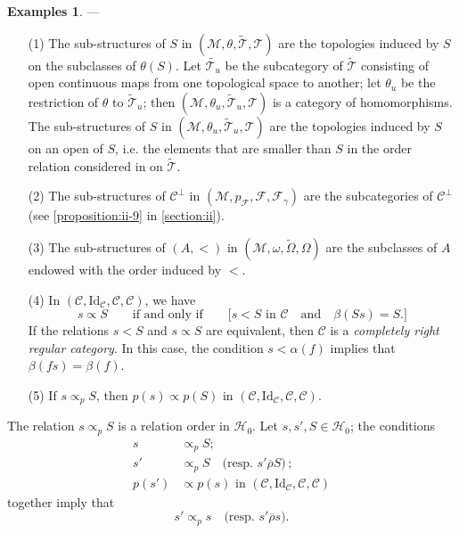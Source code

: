 \documentclass[a4paper,fleqn]{article}
\theoremstyle{plain}
\newenvironment{theorem}[1]
  {\renewcommand\theinnertheorem{#1}\innertheorem}
  {\endinnertheorem}
\theoremstyle{definition}
\newtheorem*{examples}{Examples}
\newcommand{\oldpage}[1]{{\marginpar{\footnotesize$\bigg\vert$\,\,\,\,\textit{p.~#1}}}}
\newcommand{\textand}{\quad\text{and}\quad}
\newcommand{\CC}{\mathcal{C}}
\newcommand{\HH}{\mathcal{H}}
\newcommand{\MM}{\mathcal{M}}
\newcommand{\FF}{\mathcal{F}}
\newcommand{\TT}{\mathcal{T}}
\newcommand{\tTT}{\widetilde{\TT}}
\newcommand{\relrhobar}{\mathrel{\overline{\rho}}}
\newcommand{\subs}{\mathrel{\propto}}
\newcommand{\Id}{\mathrm{Id}}
\begin{document}
\begin{examples}
  ---
  \begin{enumerate}
    \item[\normalfont(1)]
      The sub-structures of $S$ in $(\MM,\theta,\tTT,\TT)$ are the topologies induced by $S$ on the subclasses of $\theta(S)$.
      Let $\widetilde{\TT_u}$ be the subcategory of $\tTT$ consisting of open continuous maps from one topological space to another;
      let $\theta_u$ be the restriction of $\theta$ to $\tTT_u$;
      then $(\MM,\theta_u,\tTT_u,\TT)$ is a category of homomorphisms.
      The sub-structures of $S$ in $(\MM,\theta_u,\tTT_u,\TT)$ are the topologies induced by $S$ on an open of $S$, i.e. the elements that are smaller than $S$ in the order relation considered in \cite{3c} on $\tTT$.
    \item[\normalfont(2)]
      The sub-structures of $\CC^\perp$ in $(\MM,p_\FF,\FF,\FF_\gamma)$ are the subcategories of $\CC^\perp$ (see \cref{proposition:ii-9} in \cref{section:ii}).
    \item[\normalfont(3)]
      The sub-structures of $(A,<)$ in $(\MM,\omega,\widetilde{\Omega},\Omega)$ are the subclasses of $A$ endowed with the order induced by $<$.
    \item[\normalfont(4)]
      In $(\CC,\Id_\CC,\CC,\CC)$, we have
      \[
        s\subs S
        \qquad\text{if and only if}\qquad
        \big[
          \text{$s<S$ in $\CC$}
          \textand
          \beta(Ss)=S.
        \big]
      \]
      If the relations $s<S$ and $s\subs S$ are equivalent, then $\CC$ is a \emph{{completely right regular} category}.
      In this case, the condition $s<\alpha(f)$ implies that $\beta(fs)=\beta(f)$.
    \item[\normalfont(5)]
      If $s\subs_p S$, then $p(s)\subs p(S)$ in $(\CC,\Id_\CC,\CC,\CC)$.
  \end{enumerate}
\end{examples}

\begin{theorem}{1}
\label{theorem:i-1}
  \oldpage{362}
  The relation $s\subs_p S$ is a relation order in $\HH_0$.
  Let $s,s',S\in\HH_0$;
  the conditions
  \[
    \begin{aligned}
      s&\subs_p S;
    \\s'&\subs_p S
      \quad\text{(resp. $s'\relrhobar S$)}\,;
    \\p(s')&\subs p(s)\text{ in }(\CC,\Id_\CC,\CC,\CC)
    \end{aligned}
  \]
  together imply that
  \[
    s'\subs_p s
    \quad\text{(resp. $s'\relrhobar s$)}.
  \]
\end{theorem}
\end{document}

